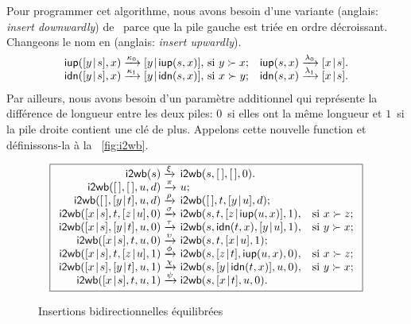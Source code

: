 Pour programmer cet algorithme, nous avons besoin d'une variante
 (anglais: \emph{insert downwardly})
de~ parce que la pile gauche est
triée en ordre décroissant. Changeons le nom  en
 (anglais: \emph{insert upwardly}).
\begin{equation*}
\begin{array}{@{}r@{\;}l@{\;}lr@{\;}l@{\;}l@{}}
  \fun{iup}(\cons{y}{s},x)
& \xrightarrow{\smash{\kappa_0}}
& \cons{y}{\fun{iup}(s,x)},\,\text{si \(y \succ x\)};
& \fun{iup}(s,x)
& \xrightarrow{\smash{\lambda_0}} & \cons{x}{s}.\\
  \fun{idn}(\cons{y}{s},x)
& \xrightarrow{\smash{\kappa_1}}
& \cons{y}{\fun{idn}(s,x)},\,\text{si \(x \succ y\)};
& \fun{idn}(s,x)
& \xrightarrow{\smash{\lambda_1}} & \cons{x}{s}.
\end{array}
\end{equation*}
Par ailleurs, nous avons besoin d'un paramètre additionnel qui
représente la différence de longueur entre les deux piles: \(0\)~si
elles ont la même longueur et \(1\)~si la pile droite contient une clé
de plus. Appelons cette nouvelle function
 et
définissons-la à la \fig~\vref{fig:i2wb}.
\begin{figure}[t]
\begin{equation*}
\boxed{%
\begin{array}{r@{\;}l@{\;}ll}
\fun{i2wb}(s)
& \xrightarrow{\smash{\xi}} & \fun{i2wb}(s,\el,\el,0).\\
\fun{i2wb}(\el,\el,u,d)
& \xrightarrow{\smash{\pi}} & u;\\
\fun{i2wb}(\el,\cons{y}{t},u,d)
& \xrightarrow{\smash{\rho}} & \fun{i2wb}(\el,t,\cons{y}{u},d);\\
\fun{i2wb}(\cons{x}{s},t,\cons{z}{u},0)
& \xrightarrow{\smash{\sigma}} &
\fun{i2wb}(s,t,\cons{z}{\fun{iup}(u,x)},1),
& \text{si \(x \succ z\)};\\
\fun{i2wb}(\cons{x}{s},\cons{y}{t},u,0)
& \xrightarrow{\smash{\tau}} &
\fun{i2wb}(s,\fun{idn}(t,x),\cons{y}{u},1),
& \text{si \(y \succ x\)};\\
\fun{i2wb}(\cons{x}{s},t,u,0)
& \xrightarrow{\smash{\upsilon}} & \fun{i2wb}(s,t,\cons{x}{u},1);\\
\fun{i2wb}(\cons{x}{s},t,\cons{z}{u},1)
& \xrightarrow{\smash{\phi}}
& \fun{i2wb}(s,\cons{z}{t},\fun{iup}(u,x),0),
& \text{si \(x \succ z\)};\\
\fun{i2wb}(\cons{x}{s},\cons{y}{t},u,1)
& \xrightarrow{\smash{\chi}}
& \fun{i2wb}(s,\cons{y}{\fun{idn}(t,x)},u,0),
& \text{si \(y \succ x\)};\\
\fun{i2wb}(\cons{x}{s},t,u,1) & \xrightarrow{\smash{\psi}} &
\fun{i2wb}(s,\cons{x}{t},u,0).
\end{array}}
\end{equation*}
\caption{Insertions bidirectionnelles équilibrées}
\label{fig:i2wb}
\end{figure}
